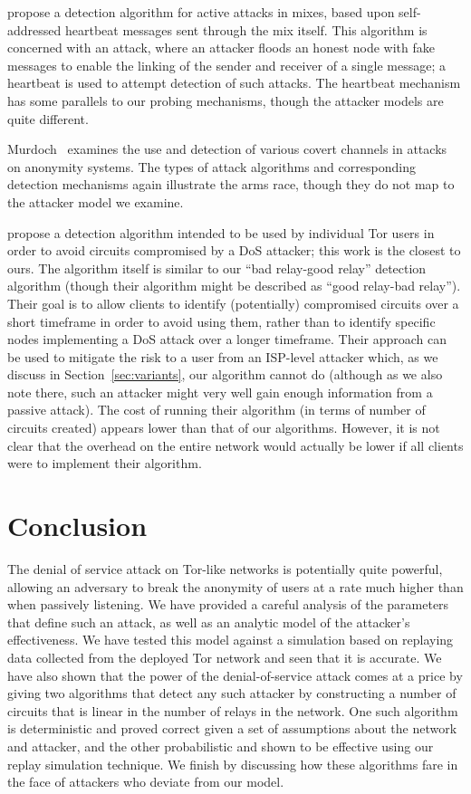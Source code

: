 \documentclass[]{lmcs}
\let\citeN\citet
\begin{document}
\citeN{danezis:wpes2003} propose a detection algorithm for active
attacks in mixes, based upon self-addressed heartbeat messages sent
through the mix itself. This algorithm is concerned with an
 attack, where an attacker floods an honest node with fake
messages to enable the linking of the sender and receiver of a single
message; a heartbeat is used to attempt detection of such attacks. The
heartbeat mechanism has some parallels to our probing mechanisms,
though the attacker models are quite different.

Murdoch~\citeyearpar{HotOrNot,steven-thesis} examines the use and
detection of various covert channels in attacks on anonymity
systems. The types of attack algorithms and corresponding detection
mechanisms again illustrate the arms race, though they do not map to
the attacker model we examine.

\citeN{das-borisov:securing-tor-tunnels}  propose a detection
algorithm intended to be used by individual Tor users in order to
avoid circuits compromised by a DoS attacker; 
this work is the closest to ours.  
The algorithm itself is similar to
our ``bad relay-good relay'' detection algorithm 
(though their algorithm might be described as ``good relay-bad relay'').
Their goal is to allow clients to
identify (potentially) compromised circuits over a short timeframe in order
to avoid using them, rather than to identify specific nodes implementing
a DoS attack over a longer timeframe.  
Their approach can be used
to mitigate the risk to a user from an ISP-level attacker which, as
we discuss in Section~\ref{sec:variants}, our algorithm cannot do
(although as we also note there, such an attacker might very well
gain enough information from a passive attack).
The cost of running their algorithm (in terms of number of circuits created) 
appears lower than that of our algorithms.
However, it is not clear that the overhead on the entire network would
actually be lower if all clients were to implement their algorithm.


\section{Conclusion}
\label{sec:conc}

The denial of service attack on Tor-like networks is potentially quite
powerful, allowing an adversary to break the anonymity of
users at a rate much higher than when passively listening.
We have provided a careful analysis of the parameters that define such
an attack, as well as an analytic model of the attacker's effectiveness.
We have tested this model against a simulation based on replaying
data collected from the deployed Tor network and seen that it is
accurate.  We have also shown that the power of the denial-of-service
attack comes at a price by giving two algorithms that detect any
such attacker by constructing a number of circuits that is linear
in the number of relays in the network.  One such algorithm is
deterministic and proved correct given a set of assumptions about the
network and attacker, and the other probabilistic and shown to be
effective using our replay simulation technique.
We finish by discussing how these algorithms fare in the face of
attackers who deviate from our model.
\end{document}
